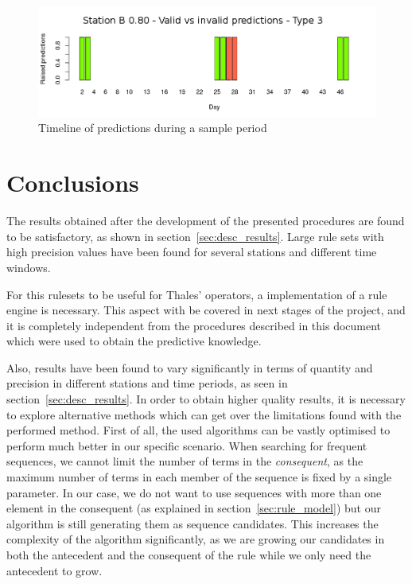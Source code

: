 \begin{figure}[hbtp]
\includegraphics[width=\textwidth]{img/scenario_right_wrong_80.png}
\caption{Timeline of predictions during a sample period} \label{fig:scenario_right_wrong_80}
\end{figure}

\clearpage

\section{Conclusions}
The results obtained after the development of the presented procedures are found to be satisfactory, as shown in section~\ref{sec:desc_results}. Large rule sets with high precision values have been found for several stations and different time windows.

For this rulesets to be useful for Thales' operators, a implementation of a rule engine is necessary. This aspect with be covered in next stages of the project, and it is completely independent from the procedures described in this document which were used to obtain the predictive knowledge.

Also, results have been found to vary significantly in terms of quantity and precision in different stations and time periods, as seen in section~\ref{sec:desc_results}. In order to obtain higher quality results, it is necessary to explore alternative methods which can get over the limitations found with the performed method. First of all, the used algorithms can be vastly optimised to perform much better in our specific scenario. When searching for frequent sequences, we cannot limit the number of terms in the \emph{consequent}, as the maximum number of terms in each member of the sequence is fixed by a single parameter. In our case, we do not want to use sequences with more than one element in the consequent (as explained in section~\ref{sec:rule_model}) but our algorithm is still generating them as sequence candidates. This increases the complexity of the algorithm significantly, as we are growing our candidates in both the antecedent and the consequent of the rule while we only need the antecedent to 
grow.

